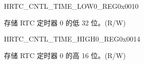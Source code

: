 \begin{register}{H}{RTC\_CNTL\_TIME\_LOW0\_REG}{0x0010}\label{regdesc:RTCCNTLTIMELOW0REG}
%
\regnewline%
\begin{regdesc}\begin{reglist}
\label{fielddesc:RTCCNTLTIMERVALUE0LOW}\item [RTC\_CNTL\_TIMER\_VALUE0\_LOW] 存储 RTC 定时器 0 的低 32 位。(R/W)
\end{reglist}\end{regdesc}
\end{register}


\begin{register}{H}{RTC\_CNTL\_TIME\_HIGH0\_REG}{0x0014}\label{regdesc:RTCCNTLTIMEHIGH0REG}
%
%
\regnewline%
\begin{regdesc}\begin{reglist}
\label{fielddesc:RTCCNTLTIMERVALUE0HIGH}\item [RTC\_CNTL\_TIMER\_VALUE0\_HIGH] 存储 RTC 定时器 0 的高 16 位。(R/W)
\end{reglist}\end{regdesc}
\end{register}


